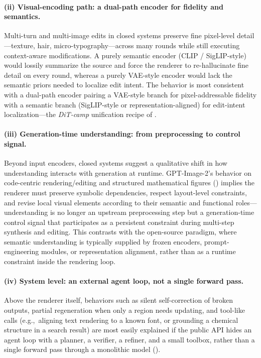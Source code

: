 \paragraph{(ii) Visual-encoding path: a dual-path encoder for fidelity and semantics.}
Multi-turn and multi-image edits in closed systems preserve fine pixel-level detail---texture, hair, micro-typography---across many rounds while still executing context-aware modifications. A purely semantic encoder (CLIP / SigLIP-style) would lossily summarize the source and force the renderer to re-hallucinate fine detail on every round, whereas a purely VAE-style encoder would lack the semantic priors needed to localize edit intent. The behavior is most consistent with a dual-path encoder pairing a VAE-style branch for pixel-addressable fidelity with a semantic branch (SigLIP-style or representation-aligned) for edit-intent localization---the \emph{DiT-camp} unification recipe of .


\paragraph{(iii) Generation-time understanding: from preprocessing to control signal.}
Beyond input encoders, closed systems suggest a qualitative shift in how understanding interacts with generation at runtime. GPT-Image-2's behavior on code-centric rendering/editing and structured mathematical figures () implies the renderer must preserve symbolic dependencies, respect layout-level constraints, and revise local visual elements according to their semantic and functional roles---understanding is no longer an upstream preprocessing step but a generation-time control signal that participates as a persistent constraint during multi-step synthesis and editing. This contrasts with the open-source paradigm, where semantic understanding is typically supplied by frozen encoders, prompt-engineering modules, or representation alignment, rather than as a runtime constraint inside the rendering loop.

\paragraph{(iv) System level: an external agent loop, not a single forward pass.}
Above the renderer itself, behaviors such as silent self-correction of broken outputs, partial regeneration when only a region needs updating, and tool-like calls (e.g.,~aligning text rendering to a known font, or grounding a chemical structure in a search result) are most easily explained if the public API hides an agent loop with a planner, a verifier, a refiner, and a small toolbox, rather than a single forward pass through a monolithic model ().


